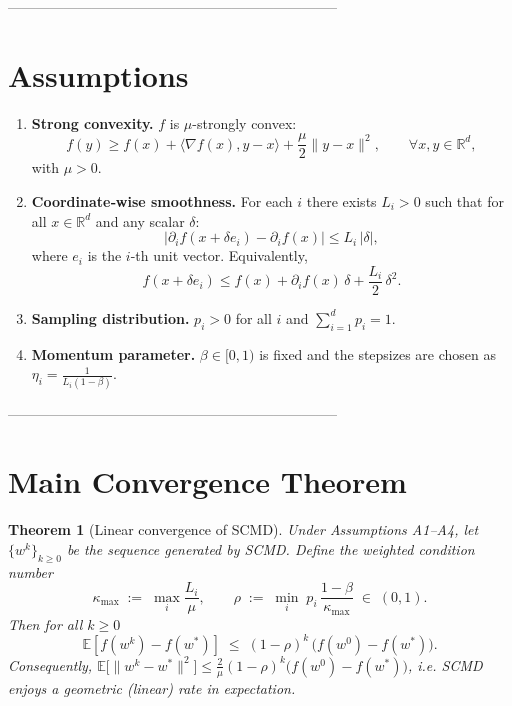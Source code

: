 \documentclass{article}
\newtheorem{theorem}{Theorem}
\newcommand{\E}{\mathbb{E}}
\newcommand{\R}{\mathbb{R}}
\begin{document}
-----------------------------------------------------------------------

\section*{Assumptions}
\begin{enumerate}[label=\textbf{A\arabic*:},leftmargin=*]
\item \textbf{Strong convexity.}  
\(f\) is \(\mu\)-strongly convex:
\[
f(y)\ge f(x)+\langle\nabla f(x),y-x\rangle+\frac{\mu}{2}\|y-x\|^{2},
\qquad \forall x,y\in\R^{d},
\]
with \(\mu>0\).

\item \textbf{Coordinate‑wise smoothness.}  
For each \(i\) there exists \(L_{i}>0\) such that for all
\(x\in\R^{d}\) and any scalar \(\delta\):
\[
\bigl|\partial_{i}f(x+\delta e_{i})-\partial_{i}f(x)\bigr|
   \le L_{i}\,|\delta|,
\]
where \(e_{i}\) is the \(i\)-th unit vector.  Equivalently,
\[
f(x+\delta e_{i})\le f(x)+\partial_{i}f(x)\,\delta
      +\frac{L_{i}}{2}\,\delta^{2}.
\]

\item \textbf{Sampling distribution.}  
\(p_{i}>0\) for all \(i\) and \(\sum_{i=1}^{d}p_{i}=1\).

\item \textbf{Momentum parameter.}  
\(\beta\in[0,1)\) is fixed and the stepsizes are chosen as
\(\displaystyle \eta_{i}= \frac{1}{L_{i}(1-\beta)}\).
\end{enumerate}

-----------------------------------------------------------------------

\section*{Main Convergence Theorem}
\begin{theorem}[Linear convergence of SCMD]\label{thm:linear}
Under Assumptions A1–A4, let \(\{w^{k}\}_{k\ge0}\) be the sequence
generated by SCMD.  Define the weighted condition number
\[
\kappa_{\max}\;:=\;\max_{i}\frac{L_{i}}{\mu},
\qquad
\rho\;:=\; \min_{i}\;p_{i}\,\frac{1-\beta}{\kappa_{\max}} \;\in\;(0,1).
\]
Then for all \(k\ge0\)
\[
\E\!\left[f(w^{k})-f(w^{*})\right]\;\le\;
(1-\rho)^{k}\,\bigl(f(w^{0})-f(w^{*})\bigr).
\]
Consequently,
\(\E\!\bigl[\|w^{k}-w^{*}\|^{2}\bigr]\le
\frac{2}{\mu}(1-\rho)^{k}\bigl(f(w^{0})-f(w^{*})\bigr)\),
i.e. SCMD enjoys a \emph{geometric} (linear) rate in expectation.
\end{theorem}
\end{document}
